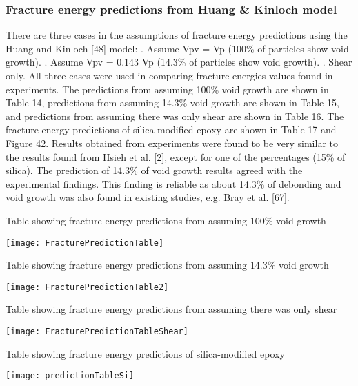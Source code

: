 \documentclass[numbers=noendperiod,chapterprefix=on]{icldt} %
\begin{document}
\subsubsection{Fracture energy predictions from Huang \& Kinloch model}

There are three cases in the assumptions of fracture energy predictions using the Huang and Kinloch [48] model:
.	Assume Vpv = Vp (100\% of particles show void growth). 
.	Assume Vpv = 0.143 Vp (14.3\% of particles show void growth). 
.	Shear only. 
\newline
All three cases were used in comparing fracture energies values found in experiments. 
The predictions from assuming 100\% void growth are shown in Table 14, predictions from assuming 14.3\% void growth are shown in Table 15, and predictions from assuming there was only shear are shown in Table 16. The fracture energy predictions of silica-modified epoxy are shown in Table 17 and Figure 42. Results obtained from experiments were found to be very similar to the results found from Hsieh et al. [2], except for one of the percentages (15\% of silica). The prediction of 14.3\% of void growth results agreed with the experimental findings. This finding is reliable as about 14.3\% of debonding and void growth was also found in existing studies, e.g. Bray et al. [67]. 

\begin{table}[!htpb]
\centering
\caption{Table showing fracture energy predictions from assuming 100\% void growth} %
\texttt{[image: FracturePredictionTable]}
\end{table}
\FloatBarrier

\begin{table}[!htpb]
\centering
\caption{Table showing fracture energy predictions from assuming 14.3\% void growth } %
\texttt{[image: FracturePredictionTable2]}
\end{table}
\FloatBarrier

\begin{table}[!htpb]
\centering
\caption{Table showing fracture energy predictions from assuming there was only shear } %
\texttt{[image: FracturePredictionTableShear]}
\end{table}
\FloatBarrier

\begin{table}[!htpb]
\centering
\caption{Table showing fracture energy predictions of silica-modified epoxy} %
\texttt{[image: predictionTableSi]}
\end{table}
\FloatBarrier
\end{document}
